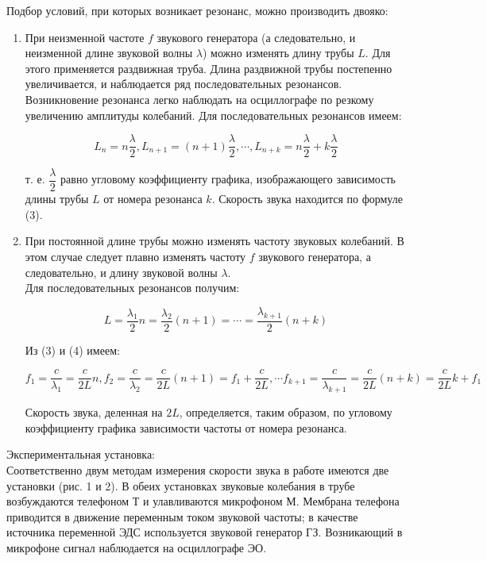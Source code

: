 \documentclass[12pt,a4paper]{article}
\begin{document}
	Подбор условий, при которых возникает резонанс, можно производить двояко:
	\begin{enumerate}
		\item При неизменной частоте $f$ звукового генератора (а следовательно, и неизменной длине звуковой волны $\lambda$) можно изменять длину трубы $L$. Для этого применяется раздвижная труба. Длина раздвижной трубы постепенно увеличивается, и наблюдается ряд последовательных резонансов. Возникновение резонанса легко наблюдать на осциллографе по резкому увеличению амплитуды колебаний. Для последовательных резонансов имеем:
		
		\begin{equation*}
			L_n = n\dfrac{\lambda}{2}, L_{n+1} = (n + 1)\dfrac{\lambda}{2}, \cdots, L_{n+k} = n\dfrac{\lambda}{2} + k\dfrac{\lambda}{2}
		\end{equation*}
		
		т. е. $\dfrac{\lambda}{2}$ равно угловому коэффициенту графика, изображающего зависимость длины трубы $L$ от номера резонанса $k$. Скорость звука находится по формуле (3).
		\item При постоянной длине трубы можно изменять частоту звуковых колебаний. В этом случае следует плавно изменять частоту $f$ звукового генератора, а следовательно, и длину звуковой волны $\lambda$.\\
		
	Для последовательных резонансов получим:
	
	\begin{equation}
		L = \dfrac{\lambda_1}{2}n = \dfrac{\lambda_2}{2}(n+1) = \cdots = \dfrac{\lambda_{k+1}}{2}(n+k)
	\end{equation}
	
	Из (3) и (4) имеем:
	
	\begin{equation}
		f_1 = \dfrac{c}{\lambda_1} = \dfrac{c}{2L}n, f_2 = \dfrac{c}{\lambda_2}=\dfrac{c}{2L}(n+1)=f_1 + \dfrac{c}{2L}, \cdots f_{k+1} = \dfrac{c}{\lambda_{k+1}} = \dfrac{c}{2L}(n+k) = \dfrac{c}{2L}k + f_1		
	\end{equation}
	
	Скорость звука, деленная на $2L$, определяется, таким образом, по угловому коэффициенту графика зависимости частоты от номера резонанса.
	\end{enumerate}
	
	Экспериментальная установка:\\
	
	Соответственно двум методам измерения скорости звука в работе имеются две установки (рис. 1 и 2). В обеих установках звуковые колебания в трубе возбуждаются телефоном Т и улавливаются микрофоном М. Мембрана телефона приводится в движение переменным током звуковой частоты; в качестве источника переменной ЭДС используется звуковой генератор ГЗ. Возникающий в микрофоне сигнал наблюдается на осциллографе ЭО.\\
	
\end{document}
